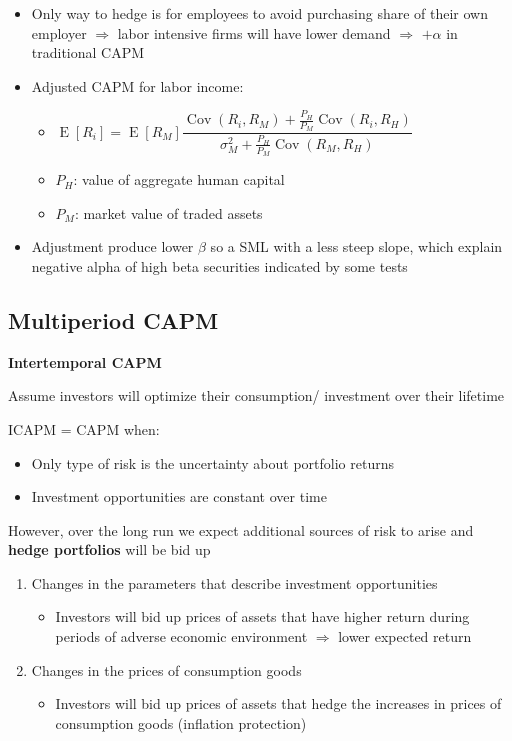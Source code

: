 \documentclass[]{book}
\providecommand{\tightlist}{%
  \setlength{\itemsep}{0pt}\setlength{\parskip}{0pt}}
\theoremstyle{definition}
\theoremstyle{definition}
\theoremstyle{remark}
\begin{document}
\begin{itemize}
\item
  Only way to hedge is for employees to avoid purchasing share of their
  own employer \(\Rightarrow\) labor intensive firms will have lower
  demand \(\Rightarrow\) \(+\alpha\) in traditional CAPM
\item
  Adjusted CAPM for labor income:

  \begin{itemize}
  \item
    \(\operatorname{E}[R_i] = \operatorname{E}[R_M] \dfrac{\operatorname{Cov}(R_i, R_M) + \frac{P_H}{P_M}\operatorname{Cov}(R_i, R_H)}{\sigma^2_M + \frac{P_H}{P_M}\operatorname{Cov}(R_M,R_H)}\)
  \item
    \(P_H\): value of aggregate human capital
  \item
    \(P_M\): market value of traded assets
  \end{itemize}
\item
  Adjustment produce lower \(\beta\) so a SML with a less steep slope,
  which explain negative alpha of high beta securities indicated by some
  tests
\end{itemize}

\subsection{Multiperiod CAPM}\label{multiperiod-capm}

\textbf{Intertemporal CAPM}

Assume investors will optimize their consumption/ investment over their
lifetime

ICAPM = CAPM when:

\begin{itemize}
\item
  Only type of risk is the uncertainty about portfolio returns
\item
  Investment opportunities are constant over time
\end{itemize}

However, over the long run we expect additional sources of risk to arise
and \textbf{hedge portfolios} will be bid up

\begin{enumerate}
\def\labelenumi{\arabic{enumi})}
\item
  Changes in the parameters that describe investment opportunities

  \begin{itemize}
  \tightlist
  \item
    Investors will bid up prices of assets that have higher return
    during periods of adverse economic environment \(\Rightarrow\) lower
    expected return
  \end{itemize}
\item
  Changes in the prices of consumption goods

  \begin{itemize}
  \tightlist
  \item
    Investors will bid up prices of assets that hedge the increases in
    prices of consumption goods (inflation protection)
  \end{itemize}
\end{enumerate}
\end{document}
